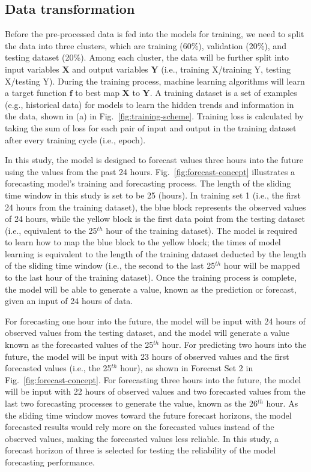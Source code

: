 \subsection{Data transformation}
Before the pre-processed data is fed into the models for training, we need to split the data into three clusters, which are training (60\%), validation (20\%), and testing dataset (20\%). Among each cluster, the data will be further split into input variables $\bm{X}$ and output variables $\bm{Y}$ (i.e., training X/training Y, testing X/testing Y). During the training process, machine learning algorithms will learn a target function $\bm{f}$ to best map $\bm{X}$ to $\bm{Y}$. A training dataset is a set of examples (e.g., historical data) for models to learn the hidden trends and information in the data, shown in (a) in Fig.~\ref{fig:training-scheme}. Training loss is calculated by taking the sum of loss for each pair of input and output in the training dataset after every training cycle (i.e., epoch).

In this study, the model is designed to forecast values three hours into the future using the values from the past 24 hours. Fig.~\ref{fig:forecast-concept} illustrates a forecasting model's training and forecasting process. The length of the sliding time window in this study is set to be 25 (hours). In training set 1 (i.e., the first 24 hours from the training dataset), the blue block represents the observed values of 24 hours, while the yellow block is the first data point from the testing dataset (i.e., equivalent to the 25$^{th}$ hour of the training dataset). The model is required to learn how to map the blue block to the yellow block; the times of model learning is equivalent to the length of the training dataset deducted by the length of the sliding time window (i.e., the second to the last 25$^{th}$ hour will be mapped to the last hour of the training dataset). Once the training process is complete, the model will be able to generate a value, known as the prediction or forecast, given an input of 24 hours of data. 

For forecasting one hour into the future, the model will be input with 24 hours of observed values from the testing dataset, and the model will generate a value known as the forecasted values of the 25$^{th}$ hour. For predicting two hours into the future, the model will be input with 23 hours of observed values and the first forecasted values (i.e., the 25$^{th}$ hour), as shown in Forecast Set 2 in Fig.~\ref{fig:forecast-concept}. For forecasting three hours into the future, the model will be input with 22 hours of observed values and two forecasted values from the last two forecasting processes to generate the value, known as the 26$^{th}$ hour. As the sliding time window moves toward the future forecast horizons, the model forecasted results would rely more on the forecasted values instead of the observed values, making the forecasted values less reliable. In this study, a forecast horizon of three is selected for testing the reliability of the model forecasting performance.

